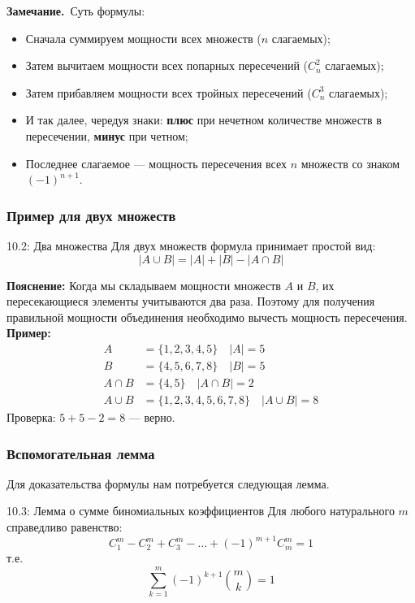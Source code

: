 \documentclass[a4paper,12pt]{article}
\newcommand{\myremark}{\textbf{Замечание.}\ }
\begin{document}
	\myremark{Суть формулы:}
	\begin{itemize}
		\item Сначала суммируем мощности всех множеств ($n$ слагаемых);
		\item Затем вычитаем мощности всех попарных пересечений ($C_n^2$ слагаемых);
		\item Затем прибавляем мощности всех тройных пересечений ($C_n^3$ слагаемых);
		\item И так далее, чередуя знаки: \textbf{плюс} при нечетном количестве множеств в пересечении, \textbf{минус} при четном;
		\item Последнее слагаемое — мощность пересечения всех $n$ множеств со знаком $(-1)^{n+1}$.
	\end{itemize}
	
	\subsubsection{Пример для двух множеств}
	
	\begin{examplebox}{10.2: Два множества}
		Для двух множеств формула принимает простой вид:
		\[ |A \cup B| = |A| + |B| - |A \cap B| \]
		
		\textbf{Пояснение:} Когда мы складываем мощности множеств $A$ и $B$, их пересекающиеся элементы учитываются два раза. Поэтому для получения правильной мощности объединения необходимо вычесть мощность пересечения.\\
		
		\textbf{Пример:} 
		\begin{align*}
			A &= \{1, 2, 3, 4, 5\} \quad |A| = 5 \\
			B &= \{4, 5, 6, 7, 8\} \quad |B| = 5 \\
			A \cap B &= \{4, 5\} \quad |A \cap B| = 2 \\
			A \cup B &= \{1, 2, 3, 4, 5, 6, 7, 8\} \quad |A \cup B| = 8
		\end{align*}
		Проверка: $5 + 5 - 2 = 8$ — верно.
	\end{examplebox}
	
	\subsubsection{Вспомогательная лемма}
	
	Для доказательства формулы нам потребуется следующая лемма.
	
	\begin{lemmabox}{10.3: Лемма о сумме биномиальных коэффициентов}
		Для любого натурального $m$ справедливо равенство:
		\[ C_1^m - C_2^m + C_3^m - \dots + (-1)^{m+1} C_m^m = 1 \]
		т.е.
		\[ \sum_{k=1}^m (-1)^{k+1} \binom{m}{k} = 1 \]
	\end{lemmabox}
	
\end{document}
